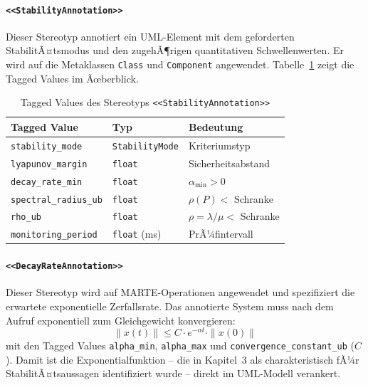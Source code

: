 ﻿\documentclass[a4paper,12pt]{scrreprt}
\theoremstyle{definition}
\begin{document}
\paragraph{\texttt{<<StabilityAnnotation>>}}

Dieser Stereotyp annotiert ein UML-Element mit dem geforderten
StabilitÃ¤tsmodus und den zugehÃ¶rigen quantitativen Schwellenwerten.
Er wird auf die Metaklassen \texttt{Class} und \texttt{Component}
angewendet. Tabelle~\ref{tab:stability-annotation} zeigt die Tagged Values
im Ãœberblick.

\begin{table}[H]
	\centering
	\begin{tabular}{@{}lll@{}}
		\toprule
		\textbf{Tagged Value} & \textbf{Typ} & \textbf{Bedeutung} \\
		\midrule
		\texttt{stability\_mode}      & \texttt{StabilityMode} & Kriteriumstyp \\
		\texttt{lyapunov\_margin}     & \texttt{float}         & Sicherheitsabstand \\
		\texttt{decay\_rate\_min}     & \texttt{float}         & $\alpha_{\min} > 0$ \\
		\texttt{spectral\_radius\_ub} & \texttt{float}         & $\rho(P) <$ Schranke \\
		\texttt{rho\_ub}              & \texttt{float}         & $\rho = \lambda/\mu <$ Schranke \\
		\texttt{monitoring\_period}   & \texttt{float} (ms)    & PrÃ¼fintervall \\
		\bottomrule
	\end{tabular}
	\caption{Tagged Values des Stereotyps \texttt{<<StabilityAnnotation>>}}
	\label{tab:stability-annotation}
\end{table}

\paragraph{\texttt{<<DecayRateAnnotation>>}}

Dieser Stereotyp wird auf MARTE-Operationen angewendet und spezifiziert die
erwartete exponentielle Zerfallsrate. Das annotierte System muss nach dem
Aufruf exponentiell zum Gleichgewicht konvergieren:
\[
\|x(t)\| \leq C \cdot e^{-\alpha t} \cdot \|x(0)\|
\]
mit den Tagged Values \texttt{alpha\_min}, \texttt{alpha\_max} und
\texttt{convergence\_constant\_ub} ($C$). Damit ist die Exponentialfunktion
-- die in Kapitel~3 als charakteristisch fÃ¼r StabilitÃ¤tsaussagen
identifiziert wurde -- direkt im UML-Modell verankert.
\end{document}
